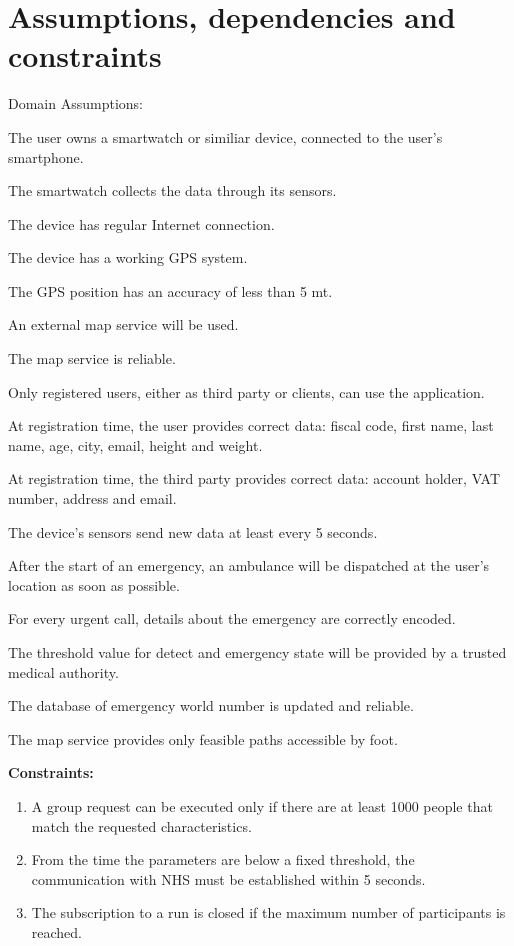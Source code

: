 \section{Assumptions, dependencies and constraints}
Domain Assumptions:
\begin{enumerate}[label={[}D.\arabic*{]}]

\item \label{d:1}
The user owns a smartwatch or similiar device, connected to the user’s smartphone.
\item\label{d:2}
The smartwatch collects the data through its sensors.
\item\label{d:3}
The device has regular Internet connection.
\item\label{d:4}
The device has a working GPS system.
\item\label{d:5}
The GPS position has an accuracy of less than 5 mt.
\item\label{d:6}
An external map service will be used.
\item\label{d:7}
The map service is reliable.
\item\label{d:8}
Only registered users, either as third party or clients, can use the application.
\item\label{d:9}
At registration time, the user provides correct data: fiscal code, first name, last name, age, city, email, height and weight.
\item\label{d:10}
At registration time, the third party provides correct data: account holder, VAT number, address and email.
\item\label{d:11}
The device’s sensors send new data at least every 5 seconds.
\item\label{d:12}
After the start of an emergency, an ambulance will be dispatched at the user’s location as soon as possible.
\item\label{d:13}
For every urgent call, details about the emergency are correctly encoded.
\item\label{d:14}
The threshold value for detect and emergency state will be provided by a trusted medical authority.
\item\label{d:15}
The database of emergency world number is updated and reliable.
\item\label{d:16}
The map service provides only feasible paths accessible by foot.
\end{enumerate}
\newpage
\textbf{Constraints:}

\begin{enumerate}
    \item\label{c:1}	A group request can be executed only if there are at least 1000 people that match the requested characteristics.
    \item\label{c:2}
    From the time the parameters are below a fixed threshold, the communication with NHS must be established within 5 seconds.
    \item\label{c:3}
    The subscription to a run is closed if the maximum number of participants is reached.
\end{enumerate}


